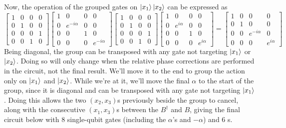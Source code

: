 \vspace{-10pt}
Now, the operation of the grouped gates on $\ket{x_1}\ket{x_2}$ can be expressed as
$$
\begin{bmatrix} 1 & 0 & 0 & 0 \\ 0 & 1 & 0 & 0 \\ 0 & 0 & 0 & 1 \\ 0 & 0 & 1 & 0 \end{bmatrix}
\begin{bmatrix} 1 & 0 & 0 & 0 \\ 0 & e^{-i\alpha} & 0 & 0 \\ 0 & 0 & 1 & 0 \\ 0 & 0& 0& e^{-i\alpha}\end{bmatrix}
\begin{bmatrix} 1 & 0 & 0 & 0 \\ 0 & 1 & 0 & 0 \\ 0 & 0 & 0 & 1 \\ 0 & 0 & 1 & 0 \end{bmatrix}
\begin{bmatrix} 1 & 0 & 0 & 0 \\ 0 & e^{i\alpha} & 0 & 0 \\ 0 & 0 & 1 & 0 \\ 0 & 0& 0& e^{i\alpha}\end{bmatrix}
=
\begin{bmatrix} 1 & 0 & 0 & 0 \\ 0 & 1 & 0 & 0 \\ 0 & 0 & e^{-i\alpha} & 0 \\ 0 & 0& 0& e^{i\alpha}\end{bmatrix}
$$
Being diagonal, the group can be transposed with any gate not targeting $\ket{x_1}$ or $\ket{x_2}$.  Doing so will only change when the relative phase corrections are performed in the circuit, not the final result.  We'll move it to the end to group the action only on $\ket{x_1}$ and $\ket{x_2}$. While we're at it, we'll move the final $\alpha$ to the start of the group, since it is diagonal and can be transposed with any gate not targeting $\ket{x_1}$.  Doing this allows the two \CNOT$(x_2,x_3)$s previously beside the group to cancel, along with the consecutive \CNOT$(x_1,x_3)$s between the $B^\dagger$ and $B$, giving the final circuit below with 8 single-qubit gates (including the $\alpha$'s and $-\alpha$) and 6 \CNOT s.
